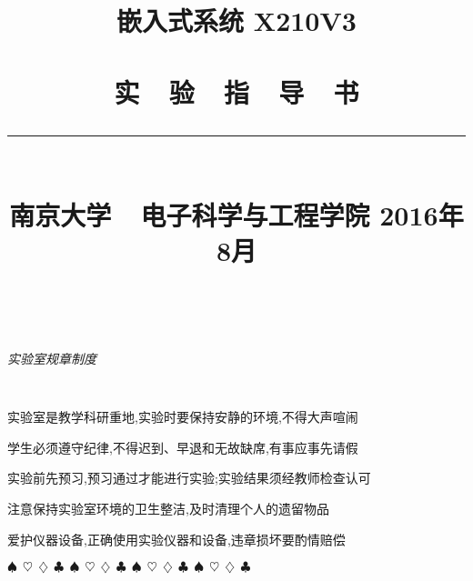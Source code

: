 \documentclass[a4paper,11pt]{book}
\title{
\begin{flushright}
\bf 嵌入式系统 X210V3 \\ \ \\
\textsf{实~~验~~指~~导~~书}\\
\rule[10pt]{.6\textwidth}{2pt}\\
\large \textsf{南京大学~~电子科学与工程学院}
\vskip 4cm 2016年8月
\end{flushright}
}
\author{}
\date{}
\renewenvironment{enumerate}
{\oldenum\setlength{\parskip}{\smallskipamount} \itemsep=-2pt}
{\oldendenum}
\begin{document}
\frontmatter
\maketitle

\thispagestyle{empty} ~ \vskip 2cm
\begin{center} \LARGE \it \textsf{实验室规章制度} \end{center}
\large \tt
\begin{enumerate}\itemsep=-5pt
  \item 实验室是教学科研重地,实验时要保持安静的环境,不得大声喧闹
  \item 学生必须遵守纪律,不得迟到、早退和无故缺席,有事应事先请假
  \item 实验前先预习,预习通过才能进行实验;实验结果须经教师检查认可
  \item 注意保持实验室环境的卫生整洁,及时清理个人的遗留物品
  \item 爱护仪器设备,正确使用实验仪器和设备,违章损坏要酌情赔偿
\end{enumerate}

\vspace{4mm}\begin{center}
$\spadesuit~~ \heartsuit~~ \diamondsuit~~ \clubsuit~~
\spadesuit~~ \heartsuit~~ \diamondsuit~~ \clubsuit~~
\spadesuit~~ \heartsuit~~ \diamondsuit~~ \clubsuit~~
\spadesuit~~ \heartsuit~~ \diamondsuit~~ \clubsuit~~$
\end{center}\vspace{4mm}



\setlength{\parindent}{2em}
\setlength\doublerulesep{.2pt}

\baselineskip=17pt
\tableofcontents

\mainmatter

\let\oldchapter\chapter
\renewcommand{\chapter}[2]
{\oldchapter{#1}
   \addthumb{#1}{\bf #2}{white}{gray}
}


\pagestyle{headings}
\setcounter{page}{1}











\end{document}
